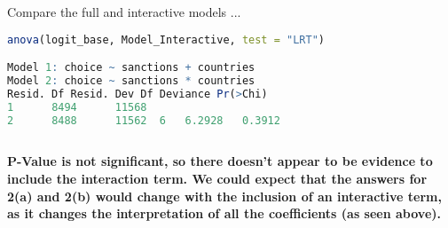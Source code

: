 \documentclass[12pt,letterpaper]{article}
\begin{document}
\noindent Compare the full and interactive models ...

\begin{lstlisting}[language=R]
anova(logit_base, Model_Interactive, test = "LRT")

Model 1: choice ~ sanctions + countries
Model 2: choice ~ sanctions * countries
Resid. Df Resid. Dev Df Deviance Pr(>Chi)
1      8494      11568                     
2      8488      11562  6   6.2928   0.3912
	
\end{lstlisting}

\noindent \textbf{P-Value is not significant, so there doesn't appear to be evidence to include the interaction term. We could expect that the answers for 2(a) and 2(b) would change with the inclusion of an interactive term, as it changes the interpretation of all the coefficients (as seen above).}
\end{document}
